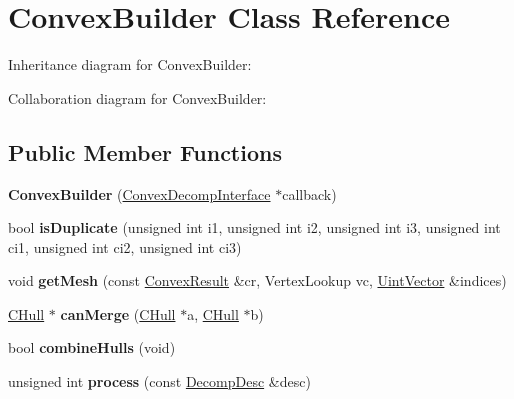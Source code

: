 \hypertarget{class_convex_builder}{\section{Convex\+Builder Class Reference}
\label{class_convex_builder}
}


Inheritance diagram for Convex\+Builder\+:


Collaboration diagram for Convex\+Builder\+:
\subsection*{Public Member Functions}
\begin{DoxyCompactItemize}
\item 
\hypertarget{class_convex_builder_a6f3cce36ddd0fa83dc8513e551ca954c}{{\bfseries Convex\+Builder} (\hyperlink{class_convex_decomposition_1_1_convex_decomp_interface}{Convex\+Decomp\+Interface} $\ast$callback)}\label{class_convex_builder_a6f3cce36ddd0fa83dc8513e551ca954c}

\item 
\hypertarget{class_convex_builder_a9203aa9ff35017024a611f48f3f3437b}{bool {\bfseries is\+Duplicate} (unsigned int i1, unsigned int i2, unsigned int i3, unsigned int ci1, unsigned int ci2, unsigned int ci3)}\label{class_convex_builder_a9203aa9ff35017024a611f48f3f3437b}

\item 
\hypertarget{class_convex_builder_ae2aada85346557d8780fcf35a0a13d0f}{void {\bfseries get\+Mesh} (const \hyperlink{class_convex_decomposition_1_1_convex_result}{Convex\+Result} \&cr, Vertex\+Lookup vc, \hyperlink{class_uint_vector}{Uint\+Vector} \&indices)}\label{class_convex_builder_ae2aada85346557d8780fcf35a0a13d0f}

\item 
\hypertarget{class_convex_builder_afe09317380f052023cc33a44c8ad1afc}{\hyperlink{class_c_hull}{C\+Hull} $\ast$ {\bfseries can\+Merge} (\hyperlink{class_c_hull}{C\+Hull} $\ast$a, \hyperlink{class_c_hull}{C\+Hull} $\ast$b)}\label{class_convex_builder_afe09317380f052023cc33a44c8ad1afc}

\item 
\hypertarget{class_convex_builder_aa3310983f122da014be579a2c90507bc}{bool {\bfseries combine\+Hulls} (void)}\label{class_convex_builder_aa3310983f122da014be579a2c90507bc}

\item 
\hypertarget{class_convex_builder_aa60b2d47867847a1df4d1c8adf9e4dc1}{unsigned int {\bfseries process} (const \hyperlink{class_convex_decomposition_1_1_decomp_desc}{Decomp\+Desc} \&desc)}\label{class_convex_builder_aa60b2d47867847a1df4d1c8adf9e4dc1}


\end{DoxyCompactItemize}
